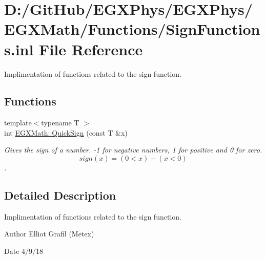 \hypertarget{_sign_functions_8inl}{}\section{D\+:/\+Git\+Hub/\+E\+G\+X\+Phys/\+E\+G\+X\+Phys/\+E\+G\+X\+Math/\+Functions/\+Sign\+Functions.inl File Reference}
\label{_sign_functions_8inl}


Implimentation of functions related to the sign function.  


\subsection*{Functions}
\begin{DoxyCompactItemize}
\item 
{\footnotesize template$<$typename T $>$ }\\int \mbox{\hyperlink{group___e_g_x_math-_functions-_sign_ga54232a5bc24caf3833c30c15def764bf}{E\+G\+X\+Math\+::\+Quick\+Sign}} (const T \&x)
\begin{DoxyCompactList}\small\item\em Gives the sign of a number. -\/1 for negative numbers, 1 for positive and 0 for zero. \[sign(x)=(0 < x) - (x < 0) \]. \end{DoxyCompactList}\end{DoxyCompactItemize}


\subsection{Detailed Description}
Implimentation of functions related to the sign function. 

\begin{DoxyAuthor}{Author}
Elliot Grafil (Metex) 
\end{DoxyAuthor}
\begin{DoxyDate}{Date}
4/9/18 
\end{DoxyDate}
